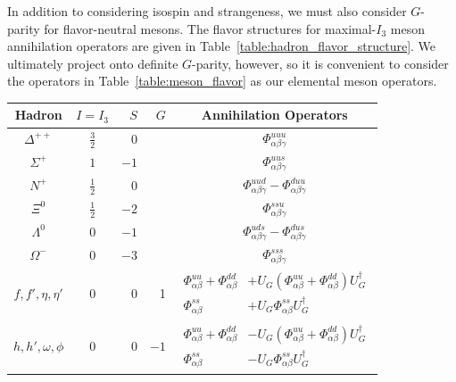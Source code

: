     In addition to considering isospin and strangeness, we must also consider $G$-parity for flavor-neutral mesons. The flavor structures for maximal-$I_3$ meson annihilation operators are given in Table~\ref{table:hadron_flavor_structure}. We ultimately project onto definite $G$-parity, however, so it is convenient to consider the operators in Table~\ref{table:meson_flavor} as our elemental meson operators.
    \begin{table}
        \begin{center}
          \begin{tabular}{|c|c|r|r|c|}
            \hline
            Hadron & $I=I_3$ & $S$ & $G$ & Annihilation Operators \\
            \hline
            $\Delta^{++}$ & $\frac{3}{2}$ & 0 & & $\Phi_{\alpha\beta\gamma}^{uuu}$ \\
            $\Sigma^{+}$ & $1$ & $-1$ & & $\Phi_{\alpha\beta\gamma}^{uus}$ \\
            $N^{+}$ & $\frac{1}{2}$ & 0 & &
            $\Phi_{\alpha\beta\gamma}^{uud} - \Phi_{\alpha\beta\gamma}^{duu}$ \\
            $\Xi^{0}$ & $\frac{1}{2}$ & $-2$ & & $\Phi_{\alpha\beta\gamma}^{ssu}$ \\
            $\Lambda^{0}$ & 0 & $-1$ & &
            $\Phi_{\alpha\beta\gamma}^{uds} - \Phi_{\alpha\beta\gamma}^{dus}$ \\
            $\Omega^{-}$ & 0 & $-3$ & & $\Phi_{\alpha\beta\gamma}^{sss}$ \\
            \hline
            $f,f',\eta,\eta'$ & 0 & 0 & 1
            & $\begin{aligned}
              \Phi_{\alpha\beta}^{uu} + \Phi_{\alpha\beta}^{dd} &+ U_G\left(
              \Phi_{\alpha\beta}^{uu} + \Phi_{\alpha\beta}^{dd}\right)U_G^{\dagger} \\
              \Phi_{\alpha\beta}^{ss} &+
              U_G\Phi_{\alpha\beta}^{ss} U_G^{\dagger}
            \end{aligned}$ \\
            $h,h',\omega,\phi$ & 0 & 0 & $-1$
            & $\begin{aligned}
              \Phi_{\alpha\beta}^{uu}+\Phi_{\alpha\beta}^{dd}&-U_G\left(
              \Phi_{\alpha\beta}^{uu}+\Phi_{\alpha\beta}^{dd}\right)U_G^\dagger \\
              \Phi_{\alpha\beta}^{ss}&-U_G\Phi_{\alpha\beta}^{ss}U_G^\dagger
            \end{aligned}$ \\

\end{tabular}
\end{center}
\end{table}

